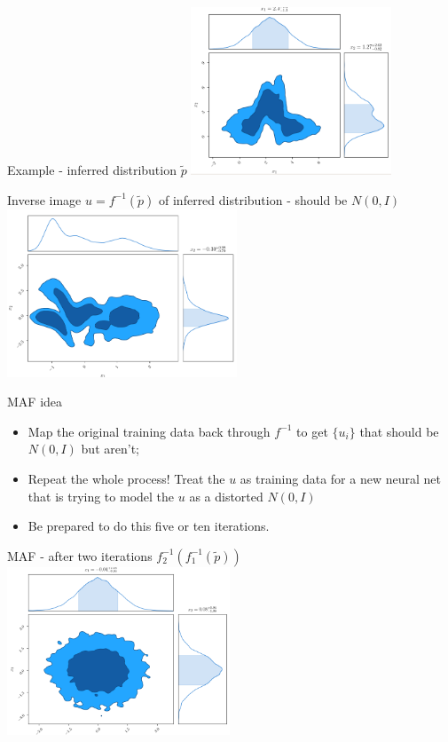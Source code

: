\documentclass[usenames,dvipsnames]{beamer}
\begin{document}
\begin{frame}{Example - inferred distribution $\tilde{p}$}
     \centering
     \includegraphics[height=5cm]{image_08}
\end{frame}

\begin{frame}{Inverse image $u = f^{-1}(\tilde{p})$ of inferred distribution - should be $N(0, I)$}
     \centering
     \includegraphics[height=5cm]{image_09}
\end{frame}

\begin{frame}{MAF idea}
    \begin{itemize}
      \item{Map the original training data back through $f^{-1}$ to get $\{u_i\}$ that should be $N(0, I)$ but aren't;}
      \item{Repeat the whole process! Treat the $u$ as training data for a new neural net that is trying to model the $u$ as a distorted $N(0, I)$}
      \item{Be prepared to do this five or ten iterations.}
    \end{itemize}
\end{frame}

\begin{frame}{MAF - after two iterations $f_2^{-1}(f_1^{-1}(\tilde{p}))$}
     \centering
     \includegraphics[height=5cm]{image_10}
\end{frame}
\end{document}
